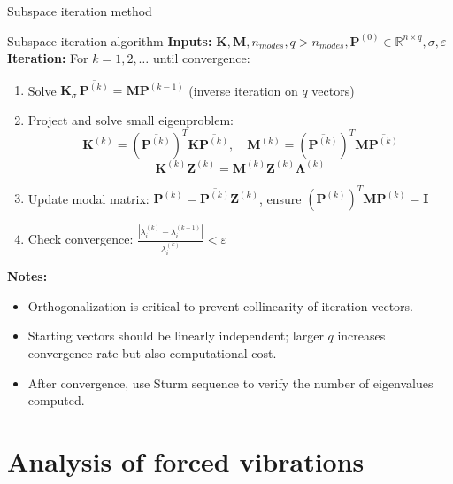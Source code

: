 \documentclass[aspectratio=169]{beamer}
\begin{document}
{\begin{frame}{Subspace iteration method}
  \end{frame}

  \begin{frame}{Subspace iteration algorithm}
    \small
    \textbf{Inputs:} \(\mathbf K, \mathbf M, n_{modes}, q>n_{modes}, \mathbf P^{(0)}\in \mathbb{R}^{n\times q}, \sigma, \varepsilon\)\\[1mm]

    \textbf{Iteration:} For \(k=1,2,\dots\) until convergence:
    \begin{enumerate}
      \item Solve \( \mathbf K_\sigma \, \overline{\mathbf P^{(k)}} = \mathbf M \mathbf P^{(k-1)} \) (inverse iteration on \(q\) vectors)
      \item Project and solve small eigenproblem:
            \[
              \mathbf K^{(k)} = (\overline{\mathbf P^{(k)}})^T \mathbf K \overline{\mathbf P^{(k)}}, \quad
              \mathbf M^{(k)} = (\overline{\mathbf P^{(k)}})^T \mathbf M \overline{\mathbf P^{(k)}}
            \]
            \[
              \mathbf K^{(k)} \mathbf Z^{(k)} = \mathbf M^{(k)} \mathbf Z^{(k)} \mathbf \Lambda^{(k)}
            \]
      \item Update modal matrix: \( \mathbf P^{(k)} = \overline{\mathbf P^{(k)}} \mathbf Z^{(k)} \), ensure \( (\mathbf P^{(k)})^T \mathbf M \mathbf P^{(k)} = \mathbf I \)
      \item Check convergence: \( \frac{|\lambda_i^{(k)} - \lambda_i^{(k-1)}|}{\lambda_i^{(k)}} < \varepsilon \)
    \end{enumerate}

    \textbf{Notes:}
    \begin{itemize}
      \item Orthogonalization is critical to prevent collinearity of iteration vectors.
      \item Starting vectors should be linearly independent; larger \(q\) increases convergence rate but also computational cost.
      \item After convergence, use Sturm sequence to verify the number of eigenvalues computed.
    \end{itemize}
  \end{frame}

 }

\section{Analysis of forced vibrations}
\end{document}
